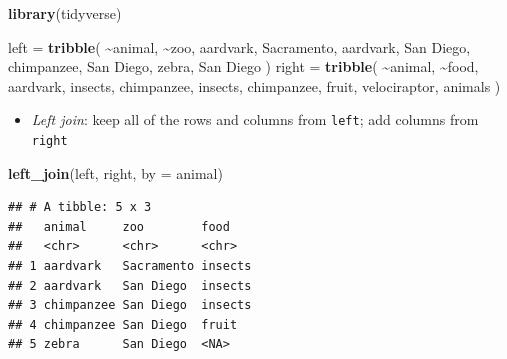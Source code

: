 \documentclass[
]{article}
\newenvironment{Shaded}{\begin{snugshade}}{\end{snugshade}}
\newcommand{\DataTypeTok}[1]{\textcolor[rgb]{0.13,0.29,0.53}{#1}}
\newcommand{\KeywordTok}[1]{\textcolor[rgb]{0.13,0.29,0.53}{\textbf{#1}}}
\newcommand{\NormalTok}[1]{#1}
\newcommand{\OperatorTok}[1]{\textcolor[rgb]{0.81,0.36,0.00}{\textbf{#1}}}
\newcommand{\StringTok}[1]{\textcolor[rgb]{0.31,0.60,0.02}{#1}}
\providecommand{\tightlist}{%
  \setlength{\itemsep}{0pt}\setlength{\parskip}{0pt}}
\begin{document}
\begin{Shaded}
\begin{Highlighting}[]
\KeywordTok{library}\NormalTok{(tidyverse)}

\NormalTok{left =}\StringTok{ }\KeywordTok{tribble}\NormalTok{(}
    \OperatorTok{\textasciitilde{}}\NormalTok{animal, }\OperatorTok{\textasciitilde{}}\NormalTok{zoo,}
    \StringTok{\textquotesingle{}aardvark\textquotesingle{}}\NormalTok{, }\StringTok{\textquotesingle{}Sacramento\textquotesingle{}}\NormalTok{, }
    \StringTok{\textquotesingle{}aardvark\textquotesingle{}}\NormalTok{, }\StringTok{\textquotesingle{}San Diego\textquotesingle{}}\NormalTok{,}
    \StringTok{\textquotesingle{}chimpanzee\textquotesingle{}}\NormalTok{, }\StringTok{\textquotesingle{}San Diego\textquotesingle{}}\NormalTok{,}
    \StringTok{\textquotesingle{}zebra\textquotesingle{}}\NormalTok{, }\StringTok{\textquotesingle{}San Diego\textquotesingle{}}
\NormalTok{)}
\NormalTok{right =}\StringTok{ }\KeywordTok{tribble}\NormalTok{(}
    \OperatorTok{\textasciitilde{}}\NormalTok{animal, }\OperatorTok{\textasciitilde{}}\NormalTok{food, }
    \StringTok{\textquotesingle{}aardvark\textquotesingle{}}\NormalTok{, }\StringTok{\textquotesingle{}insects\textquotesingle{}}\NormalTok{, }
    \StringTok{\textquotesingle{}chimpanzee\textquotesingle{}}\NormalTok{, }\StringTok{\textquotesingle{}insects\textquotesingle{}}\NormalTok{, }
    \StringTok{\textquotesingle{}chimpanzee\textquotesingle{}}\NormalTok{, }\StringTok{\textquotesingle{}fruit\textquotesingle{}}\NormalTok{, }
    \StringTok{\textquotesingle{}velociraptor\textquotesingle{}}\NormalTok{, }\StringTok{\textquotesingle{}animals\textquotesingle{}}
\NormalTok{)}
\end{Highlighting}
\end{Shaded}

\begin{itemize}
\tightlist
\item
  \emph{Left join}: keep all of the rows and columns from \texttt{left}; add columns from \texttt{right}
\end{itemize}

\begin{Shaded}
\begin{Highlighting}[]
\KeywordTok{left\_join}\NormalTok{(left, right, }\DataTypeTok{by =} \StringTok{\textquotesingle{}animal\textquotesingle{}}\NormalTok{)}
\end{Highlighting}
\end{Shaded}

\begin{verbatim}
## # A tibble: 5 x 3
##   animal     zoo        food   
##   <chr>      <chr>      <chr>  
## 1 aardvark   Sacramento insects
## 2 aardvark   San Diego  insects
## 3 chimpanzee San Diego  insects
## 4 chimpanzee San Diego  fruit  
## 5 zebra      San Diego  <NA>
\end{verbatim}
\end{document}
